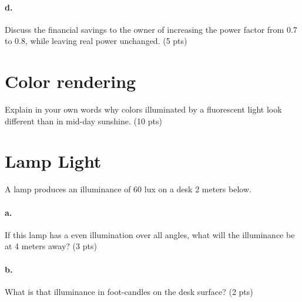 \documentclass{article}
\newif\ifsolution
\newcommand{\solution}[1]
{\ifsolution
\vspace{10pt}
{\color{answer-color} #1}
\else\fi}
\begin{document}
\paragraph{d.} Discuss the financial savings to the owner of increasing the power
factor from 0.7 to 0.8, while leaving real power unchanged. (5 pts)

\solution{
An improvement in the power factor (for equal real power) would decrease
the consumption of reactive power and current.  This would have the
benefits of lowering the current in the distribution, lowering line
losses.  It could also avoid charges from the utility for poor power
factor or for the delivery of reactive power.
}


\section{Color rendering}

Explain in your own words why colors illuminated by a fluorescent light
look different than in mid-day sunshine. (10 pts)

\solution{Our perception of the color of an object is based on the
relative powers of the different wavelengths of visible radiation
reflected by the object.  If the mixture of wavelengths illuminating the
object are different, the reflected spectrum, and thus the perceived
color of the object will be different.}

\section{Lamp Light}

A lamp produces an illuminance of 60 lux on a desk 2 meters below.

\paragraph{a.} If this lamp has a even illumination over all angles, what will the
illuminance be at 4 meters away? (3 pts)

\solution{
By the inverse square law, since the distance increases by a factor of
two the illumanance will decrease by a factor of 4 and be 15 lux.
}

\paragraph{b.} What is that illuminance in foot-candles on the desk surface? (2
pts)
\end{document}
